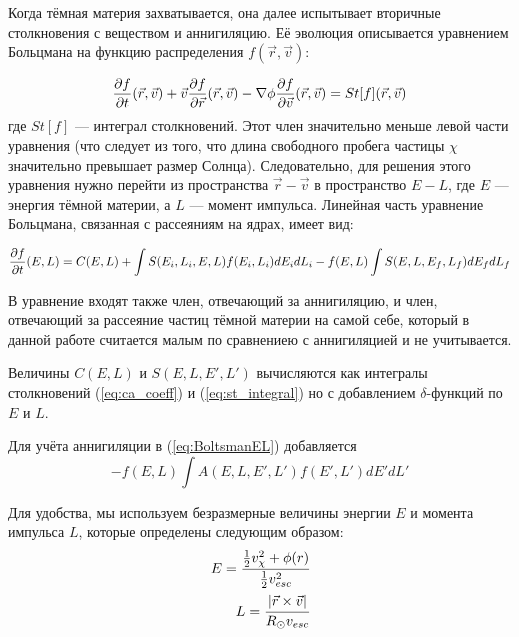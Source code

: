 Когда тёмная материя захватывается, она далее испытывает вторичные столкновения с веществом и аннигиляцию. Её эволюция описывается уравнением Больцмана на функцию распределения $f(\vec{r},\vec{v})$:

\begin{equation}
	\label{eq:Boltsman}
	\frac{\partial f}{\partial t}(\vec{r},\vec{v}) + \vec{v} \frac{\partial f}{\partial \vec{r}}(\vec{r},\vec{v}) - \nabla \phi \frac{\partial f}{\partial \vec{v}}(\vec{r},\vec{v}) = 
	St[f] (\vec{r},\vec{v})
\end{equation} 
где $St[f]$ --- интеграл столкновений. Этот член значительно меньше левой части уравнения (что следует из того, что длина свободного пробега частицы $\chi$ значительно превышает размер Солнца). Следовательно, для решения этого уравнения нужно перейти из пространства $\vec{r}-\vec{v}$ в пространство $E-L$, где $E$ --- энергия тёмной материи, а $L$ --- момент импульса. Линейная часть уравнение Больцмана, связанная с рассеяниям на ядрах, имеет вид:

\begin{equation}
	\label{eq:BoltsmanEL}
	\frac{\partial f}{\partial t}(E,L) = C(E,L) + \int{ S(E_i,L_i,E,L) f(E_i,L_i) dE_idL_i } 
	-f(E,L) \int{ S(E,L,E_f,L_f)  dE_fdL_f }
\end{equation}

В уравнение входят также член, отвечающий за аннигиляцию, и член, отвечающий за рассеяние частиц тёмной материи на самой себе, который в данной работе считается малым по сравнениею с аннигиляцией и не учитывается.

Величины $C(E,L)$ и $S(E,L,E',L')$ вычисляются как интегралы столкновений (\ref{eq:ca_coeff}) и (\ref{eq:st_integral}) но с добавлением $\delta$-функций по $E$ и $L$.

Для учёта аннигиляции в (\ref{eq:BoltsmanEL}) добавляется 
\begin{equation}
	-\label{eq:BoltsmanAnn}
	f(E,L) \int{ A(E,L,E',L') f(E',L') dE'dL' }
\end{equation}

Для удобства, мы используем безразмерные величины энергии $E$ и момента импульса $L$, которые определены следующим образом:
\begin{equation}
	\begin{split}
		E = \cfrac{\frac{1}{2} v_{\chi}^2 + \phi(r)}
		{\frac{1}{2} v_{esc}^2} \\
		L = \cfrac{|\vec{r} \times \vec{v}|}
		{R_{\odot} v_{esc}}
	\end{split}
	\label{eq:dimentionless}
\end{equation}

